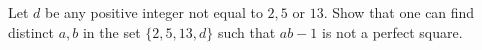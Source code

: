 Let $d$ be any positive integer not equal to $2, 5$ or $13$. Show that one can find distinct $a,b$ in the set $\{2,5,13,d\}$ such that $ab-1$ is not a perfect square.